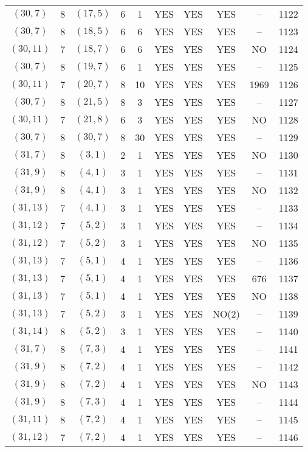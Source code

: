 \begin{longtable}{|c|c|c|c|c|c|c|c|c|c|}
$(30, 7)$ & 8 & $(17, 5)$ & 6 & 1 & YES & YES & YES & -- & 1122\\
$(30, 7)$ & 8 & $(18, 5)$ & 6 & 6 & YES & YES & YES & -- & 1123\\
$(30, 11)$ & 7 & $(18, 7)$ & 6 & 6 & YES & YES & YES & NO & 1124\\
$(30, 7)$ & 8 & $(19, 7)$ & 6 & 1 & YES & YES & YES & -- & 1125\\
$(30, 11)$ & 7 & $(20, 7)$ & 8 & 10 & YES & YES & YES & 1969 & 1126\\
$(30, 7)$ & 8 & $(21, 5)$ & 8 & 3 & YES & YES & YES & -- & 1127\\
$(30, 11)$ & 7 & $(21, 8)$ & 6 & 3 & YES & YES & YES & NO & 1128\\
$(30, 7)$ & 8 & $(30, 7)$ & 8 & 30 & YES & YES & YES & -- & 1129\\
$(31, 7)$ & 8 & $(3, 1)$ & 2 & 1 & YES & YES & YES & NO & 1130\\
$(31, 9)$ & 8 & $(4, 1)$ & 3 & 1 & YES & YES & YES & -- & 1131\\
$(31, 9)$ & 8 & $(4, 1)$ & 3 & 1 & YES & YES & YES & NO & 1132\\
$(31, 13)$ & 7 & $(4, 1)$ & 3 & 1 & YES & YES & YES & -- & 1133\\
$(31, 12)$ & 7 & $(5, 2)$ & 3 & 1 & YES & YES & YES & -- & 1134\\
$(31, 12)$ & 7 & $(5, 2)$ & 3 & 1 & YES & YES & YES & NO & 1135\\
$(31, 13)$ & 7 & $(5, 1)$ & 4 & 1 & YES & YES & YES & -- & 1136\\
$(31, 13)$ & 7 & $(5, 1)$ & 4 & 1 & YES & YES & YES & 676 & 1137\\
$(31, 13)$ & 7 & $(5, 1)$ & 4 & 1 & YES & YES & YES & NO & 1138\\
$(31, 13)$ & 7 & $(5, 2)$ & 3 & 1 & YES & YES & NO(2) & -- & 1139\\
$(31, 14)$ & 8 & $(5, 2)$ & 3 & 1 & YES & YES & YES & -- & 1140\\
$(31, 7)$ & 8 & $(7, 3)$ & 4 & 1 & YES & YES & YES & -- & 1141\\
$(31, 9)$ & 8 & $(7, 2)$ & 4 & 1 & YES & YES & YES & -- & 1142\\
$(31, 9)$ & 8 & $(7, 2)$ & 4 & 1 & YES & YES & YES & NO & 1143\\
$(31, 9)$ & 8 & $(7, 3)$ & 4 & 1 & YES & YES & YES & -- & 1144\\
$(31, 11)$ & 8 & $(7, 2)$ & 4 & 1 & YES & YES & YES & -- & 1145\\
$(31, 12)$ & 7 & $(7, 2)$ & 4 & 1 & YES & YES & YES & -- & 1146\\

\end{longtable}
